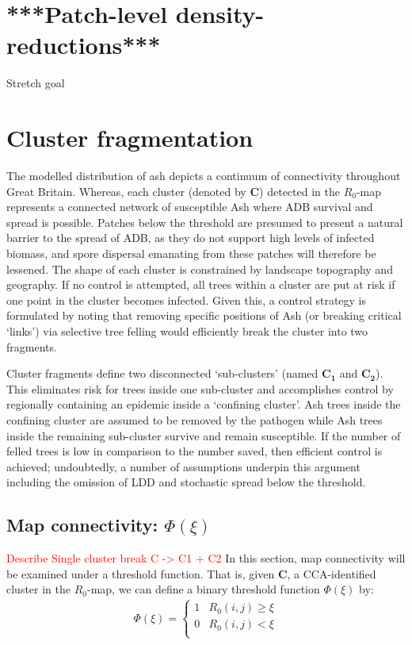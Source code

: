 \section{***Patch-level density-reductions***}
Stretch goal

\textcolor{red}{\blindtext}

\section{Cluster fragmentation}

The modelled distribution of ash depicts a continuum of connectivity throughout Great Britain.
Whereas, each cluster (denoted by $\mathbf{C}$) detected in the $R_0$-map represents a connected network of susceptible Ash where ADB survival and spread is possible. 
Patches below the threshold are presumed to present a natural barrier to the spread of ADB, 
as they do not support high levels of infected biomass, and spore dispersal emanating from these patches will therefore be lessened.
The shape of each cluster is constrained by landscape topography and geography. 
If no control is attempted, all trees within a cluster are put at risk if one point in the cluster becomes infected. 
Given this, a control strategy is formulated by noting that removing specific positions of Ash (or breaking critical `links')
via selective tree felling would efficiently break the cluster into two fragments. 

Cluster fragments define two disconnected `sub-clusters' (named $\mathbf{C_1}$ and $\mathbf{C_2}$). 
This eliminates risk for trees inside one sub-cluster and accomplishes control by regionally containing an epidemic inside a `confining cluster'. 
Ash trees inside the confining cluster are assumed to be removed by the pathogen while Ash trees inside the remaining sub-cluster survive and remain susceptible.
If the number of felled trees is low in comparison to the number saved, then efficient control is achieved;
undoubtedly, a number of assumptions underpin this argument including the omission of LDD and stochastic spread below the threshold.

\subsection{Map connectivity: $\Phi(\xi)$}

\textcolor{red}{Describe Single cluster break C -> C1 + C2}
In this section, map connectivity will be examined under a threshold function.
That is, given $\mathbf{C}$, a CCA-identified cluster in the $R_0$-map, we can define a binary threshold function $\Phi(\xi)$ by:
\begin{align}
\label{eq:alpha-step}
\Phi(\xi) = \left\{ \begin{array}{cc} 
                1 & R_0(i, j) \geq \xi \\
                0 & R_0(i, j) < \xi \\
                \end{array} \right.
\end{align}

